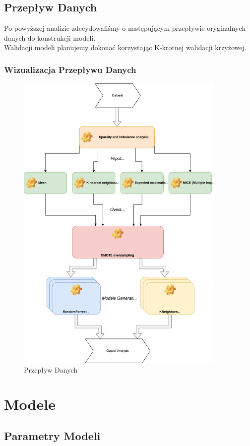 \documentclass[11pt]{article}
\begin{document}
\subsection{Przepływ Danych}
Po powyższej analizie zdecydowaliśmy o następującym przepływie oryginalnych danych do konstrukcji modeli.\\
Walidacji modeli planujemy dokonać korzystając K-krotnej walidacji krzyżowej.
\subsubsection{Wizualizacja Przepływu Danych}
\begin{figure}[h]
	\caption{Przepływ Danych}
	\begin{center}
		\includegraphics[width=4in]{Dataflow}
	\end{center}
\end{figure}
\section{Modele}
\subsection{Parametry Modeli}
\end{document}
